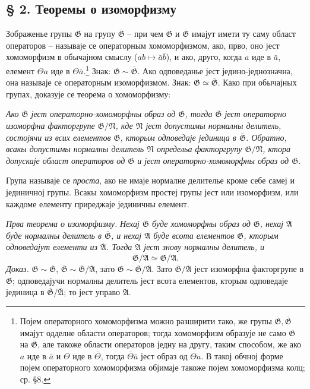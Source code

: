 ﻿\documentclass[11pt]{article}
\providecommand{\mG}{\mathfrak{G}}
\providecommand{\mA}{\mathfrak{A}}
\providecommand{\mN}{\mathfrak{N}}
\begin{document}
\setcounter{footnote}{9}

\subsection*{§ 2. Теоремы о изоморфизму}

Зображенье групы $\mG$ на групу $\overline{\mG}$ -- при чем $\mG$ и $\overline{\mG}$ имајут имети ту саму област операторов -- называје се операторным хомоморфизмом, ако, прво, оно јест хомоморфизм в обычајном смыслу ($ab\mapsto \bar a\bar b$), и ако, друго, когда $a$ иде в $\bar a$, елемент $\Theta a$ иде в $\Theta\bar a$.\footnote{Појем операторного хомоморфизма можно разширити тако, же групы $\mG,\overline{\mG}$ имајут одделне области операторов; тогда хомоморфизм образује не само $\mG$ на $\overline{\mG}$, але такоже области операторов једну на другу, таким способом, же ако $a$ иде в $\bar a$ и $\Theta$ иде в $\overline\Theta$, тогда $\overline\Theta\bar a$ јест образ од $\Theta a$. В такој обчној форме појем операторного хомоморфизма објимаје такоже појем хомоморфизма колц; ср. §8.} Знак: $\mG\sim\overline{\mG}$. Ако одповеданье јест једино-једнозначна, она называје се операторным изоморфизмом. Знак: $\mG\simeq\overline{\mG}$. Како при обычајных групах, доказује се теорема о хомоморфизму:

\emph{Ако $\overline{\mG}$ јест операторно-хомоморфны образ од $\mG$, тогда $\overline{\mG}$ јест операторно изоморфна факторгрупе $\mG/\mN$, кде $\mN$ јест допустимы нормалны делитель, состојячи из всих елементов $\mG$, кторым одповедаје јединица в $\overline{\mG}$. Обратно, всакы допустимы нормалны делитель $\mN$ определьа факторгрупу $\mG/\mN$, ктора допускаје област операторов од $\mG$ и јест операторно-хомоморфны образ од $\mG$.}

Група называје се \emph{проста}, ако не имаје нормалне делителье кроме себе самеј и јединичној групы. Всакы хомоморфизм простеј групы јест или изоморфизм, или каждоме елементу приреджаје јединичны елемент.

\emph{Прва теорема о изоморфизму.} \emph{Нехај $\overline{\mG}$ буде хомоморфны образ од $\mG$, нехај $\overline{\mA}$ буде нормалны делитель в $\overline{\mG}$, и нехај $\mA$ буде всота елементов $\mG$, кторым одповедајут елементи из $\overline{\mA}$. Тогда $\mA$ јест знову нормалны делитель, и}
\[
        \overline{\mG}/\overline{\mA}\simeq \mG/\mA. \tag{1}
\]
\emph{Доказ.} $\mG\sim\overline{\mG}$, $\overline{\mG}\sim\overline{\mG}/\overline{\mA}$, зато $\mG\sim\overline{\mG}/\overline{\mA}$. Зато $\overline{\mG}/\overline{\mA}$ јест изоморфна факторгрупе в $\mG$; одповедајучи нормалны делитель јест всота елементов, кторым одповедаје јединица в $\overline{\mG}/\overline{\mA}$; то јест управо $\mA$.
\end{document}
